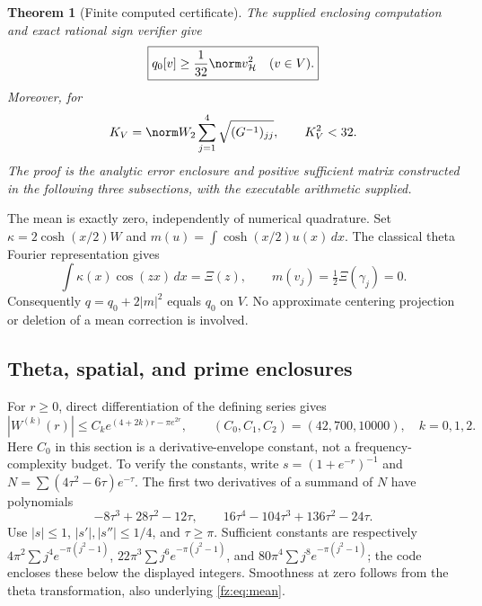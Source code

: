 \documentclass[11pt,a4paper]{article}
\numberwithin{equation}{section}
\newtheorem{theorem}{Theorem}[section]
\theoremstyle{definition}\newtheorem{definition}[theorem]{Definition}
\theoremstyle{remark}\newtheorem{remark}[theorem]{Remark}
\newcommand{\Hh}{\mathcal H}\newcommand{\Hw}{\mathcal H}
\begin{document}
\begin{theorem}[Finite computed certificate]\label{fz:thm:finite}
The supplied enclosing computation and exact rational sign verifier give
\begin{equation}\label{fz:eq:main}
 \boxed{q_0[v]\ge\frac1{32}\norm v_{\Hh}^2\quad(v\in V).}
\end{equation}
Moreover, for
\begin{equation}\label{fz:eq:KV}
 K_V=\norm W_2\sum_{j=1}^4\sqrt{(G^{-1})_{jj}},
 \qquad K_V^2<32.
\end{equation}
The proof is the analytic error enclosure and positive sufficient matrix
constructed in the following three subsections, with the executable arithmetic supplied.
\end{theorem}

The mean is exactly zero, independently of numerical quadrature. Set
$\kappa=2\cosh(x/2)W$ and $m(u)=\int\cosh(x/2)u(x)\,dx$.
The classical theta Fourier representation \cite[(1.2)]{fzLagarias} gives
\begin{equation}\label{fz:eq:mean}
 \int\kappa(x)\cos(zx)\,dx=\Xi(z),\qquad
 m(v_j)=\tfrac12\Xi(\gamma_j)=0.
\end{equation}
Consequently $q=q_0+2|m|^2$ equals $q_0$ on $V$. No approximate
centering projection or deletion of a mean correction is involved.

\subsection{Theta, spatial, and prime enclosures}

For $r\ge0$, direct differentiation of the defining series gives
\begin{equation}\label{fz:eq:envelope}
 |W^{(k)}(r)|\le C_ke^{(4+2k)r-\pi e^{2r}},\qquad
 (C_0,C_1,C_2)=(42,700,10000),\quad k=0,1,2.
\end{equation}
Here $C_0$ in this section is a derivative-envelope constant, not a
frequency-complexity budget. To verify the constants, write
$s=(1+e^{-r})^{-1}$ and $N=\sum(4\tau^2-6\tau)e^{-\tau}$.
The first two derivatives of a summand of $N$ have polynomials
\[
 -8\tau^3+28\tau^2-12\tau,\qquad
 16\tau^4-104\tau^3+136\tau^2-24\tau.
\]
Use $|s|\le1$, $|s'|,|s''|\le1/4$, and $\tau\ge\pi$.
Sufficient constants are respectively
$4\pi^2\sum j^4e^{-\pi(j^2-1)}$,
$22\pi^3\sum j^6e^{-\pi(j^2-1)}$,
and $80\pi^4\sum j^8e^{-\pi(j^2-1)}$; the code encloses these below
the displayed integers. Smoothness at zero follows from the theta
transformation, also underlying \eqref{fz:eq:mean}.
\end{document}
